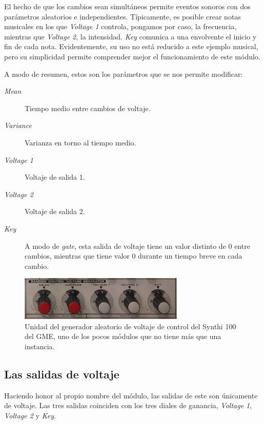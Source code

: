 El hecho de que los cambios sean simultáneos permite eventos sonoros con dos parámetros aleatorios e independientes. Típicamente, es posible crear notas musicales en los que \textit{Voltage 1} controla, pongamos por caso, la frecuencia, mientras que \textit{Voltage 2}, la intensidad. \textit{Key} comunica a una envolvente el inicio y fin de cada nota. Evidentemente, su uso no está reducido a este ejemplo musical, pero su simplicidad permite comprender mejor el funcionamiento de este módulo.

A modo de resumen, estos son los parámetros que se nos permite modificar:

\begin{description}
	\item[\textit{Mean}] Tiempo medio entre cambios de voltaje. 
	\item[\textit{Variance}] Varianza en torno al tiempo medio.
	\item[\textit{Voltage 1}] Voltaje de salida 1.
	\item[\textit{Voltage 2}] Voltaje de salida 2.
	\item[\textit{Key}] A modo de \textit{gate}, esta salida de voltaje tiene un valor distinto de 0 entre cambios, mientras que tiene valor 0 durante un tiempo breve en cada cambio.
\end{description}


\begin{figure}
	\centering
	\includegraphics[width=0.7\textwidth]{images/random_generator}
	\caption[\textit{Random Voltage Control Generator}]{Unidad del generador aleatorio de voltaje de control del Synthi 100 del GME, uno de los pocos módulos que no tiene más que una instancia.}
	\label{fig:random_generator}
\end{figure}

\subsection{Las salidas de voltaje}

Haciendo honor al propio nombre del módulo, las salidas de este son únicamente de voltaje. Las tres salidas coinciden con los tres diales de ganancia, \textit{Voltage 1}, \textit{Voltage 2} y \textit{Key}.


